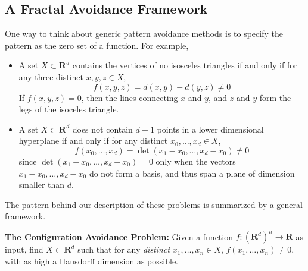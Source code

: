 \documentclass{article}
\theoremstyle{plain}
\theoremstyle{plain}
\begin{document}
\begin{multicols}{2}
\section{A Fractal Avoidance Framework}

One way to think about generic pattern avoidance methods is to specify the pattern as the zero set of a function. For example,
%
\begin{itemize}

	\item A set $X \subset \mathbf{R}^d$ contains the vertices of no isosceles triangles if and only if for any three distinct $x,y,z \in X$,
	\[ f(x,y,z) = d(x,y) - d(y,z) \neq 0 \]
	If $f(x,y,z) = 0$, then the lines connecting $x$ and $y$, and $z$ and $y$ form the legs of the isoceles triangle.


	\item A set $X \subset \mathbf{R}^d$ does not contain $d+1$ points in a lower dimensional hyperplane if and only if for any distinct $x_0, \dots, x_d \in X$,
	\[ f(x_0, \dots, x_d) = \det(x_1 - x_0, \dots, x_d - x_0) \neq 0 \]
	since $\det(x_1 - x_0, \dots, x_d - x_0) = 0$ only when the vectors $x_1 - x_0, \dots, x_d - x_0$ do not form a basis, and thus span a plane of dimension smaller than $d$.
\end{itemize}
%
The pattern behind our description of these problems is summarized by a general framework.

\begin{changemargin}{0.5em}{0em}
{\bf The Configuration Avoidance Problem:} Given a function $f: (\mathbf{R}^d)^n \to \mathbf{R}$ as input, find $X \subset \mathbf{R}^d$ such that for any {\it distinct} $x_1, \dots, x_n \in X$, $f(x_1, \dots, x_n) \neq 0$, with as high a Hausdorff dimension as possible.
\end{changemargin}


\end{multicols}
\end{document}
